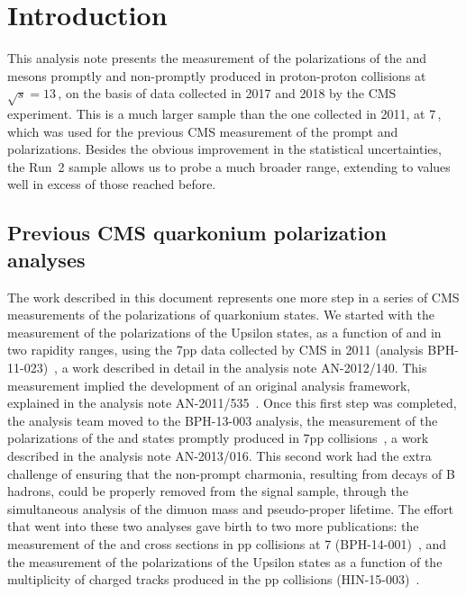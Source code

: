 \section{Introduction}
\label{sec:Introduction}

This analysis note presents the measurement of the polarizations of the \jpsi and \psip mesons promptly and non-promptly produced in proton-proton collisions at $\sqrt{s} = 13$\,\TeV, on the basis of data collected in 2017 and 2018 by the CMS experiment. This is a much larger sample than the one collected in 2011, at 7\,\TeV, which was used for the previous CMS measurement of the prompt \jpsi and \psip polarizations. Besides the obvious improvement in the statistical uncertainties, the Run~2 sample allows us to probe a much broader \pt range, extending to \pt values well in excess of those reached before.

\subsection{Previous CMS quarkonium polarization analyses}

The work described in this document represents one more step in a series of CMS measurements 
of the polarizations of quarkonium states.
We started with the measurement of the polarizations of the Upsilon states, 
as a function of \pt and in two rapidity ranges,
using the 7\TeV pp data collected by CMS in 2011 (analysis BPH-11-023)~\cite{bib:BPH-11-023}, 
a work described in detail in the analysis note AN-2012/140.
This measurement implied the development of an original analysis framework, 
explained in the analysis note AN-2011/535~\cite{bib:AN-2011/535}.
Once this first step was completed, the analysis team moved to the BPH-13-003 analysis, 
the measurement of the polarizations of the 
\jpsi and \psip states promptly produced in 7\TeV pp collisions~\cite{bib:BPH-13-003},
a work described in the analysis note AN-2013/016.
This second work had the extra challenge of ensuring that the non-prompt charmonia,
resulting from decays of B hadrons, could be properly removed from the signal sample,
through the simultaneous analysis of the dimuon mass and pseudo-proper lifetime.
The effort that went into these two analyses gave birth to two more publications:
the measurement of the \jpsi and \psip cross sections in pp collisions at 7\TeV 
(BPH-14-001)~\cite{bib:BPH-14-001},
and the measurement of the polarizations of the Upsilon states as a function of 
the multiplicity of charged tracks produced in the pp collisions 
(HIN-15-003)~\cite{bib:HIN-15-003}.

